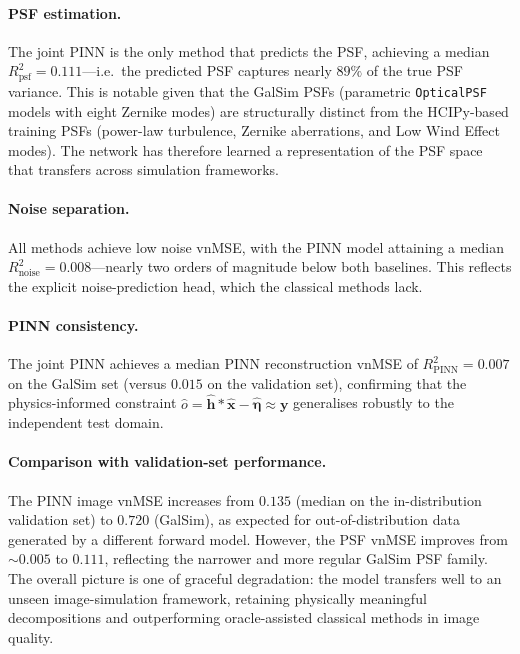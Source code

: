 \documentclass{aa}
\begin{document}
\paragraph{PSF estimation.} The joint PINN is the only method that predicts the PSF, achieving a median $R^2_\mathrm{psf} = 0.111$---i.e.\ the predicted PSF captures nearly $89\%$ of the true PSF variance. This is notable given that the GalSim PSFs (parametric \texttt{OpticalPSF} models with eight Zernike modes) are structurally distinct from the HCIPy-based training PSFs (power-law turbulence, Zernike aberrations, and Low Wind Effect modes). The network has therefore learned a representation of the PSF space that transfers across simulation frameworks.

\paragraph{Noise separation.} All methods achieve low noise vnMSE, with the PINN model attaining a median $R^2_\mathrm{noise} = 0.008$---nearly two orders of magnitude below both baselines. This reflects the explicit noise-prediction head, which the classical methods lack.

\paragraph{PINN consistency.} The joint PINN achieves a median PINN reconstruction vnMSE of $R^2_\mathrm{PINN} = 0.007$ on the GalSim set (versus $0.015$ on the validation set), confirming that the physics-informed constraint $\hat{o} = \hat{\mathbf{h}} \ast \hat{\mathbf{x}} - \hat{\boldsymbol{\eta}} \approx \mathbf{y}$ generalises robustly to the independent test domain.

\paragraph{Comparison with validation-set performance.} The PINN image vnMSE increases from $0.135$ (median on the in-distribution validation set) to $0.720$ (GalSim), as expected for out-of-distribution data generated by a different forward model. However, the PSF vnMSE improves from $\sim 0.005$ to $0.111$, reflecting the narrower and more regular GalSim PSF family. The overall picture is one of graceful degradation: the model transfers well to an unseen image-simulation framework, retaining physically meaningful decompositions and outperforming oracle-assisted classical methods in image quality.
\end{document}
